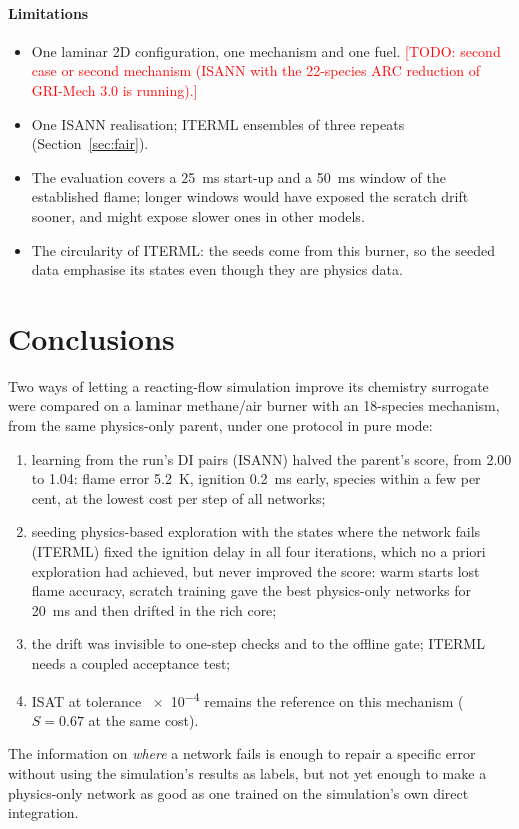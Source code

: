 \documentclass[preprint,review,12pt]{elsarticle}
\newcommand{\todo}[1]{\textcolor{red}{[TODO: #1]}}
\begin{document}
\paragraph{Limitations}
\begin{itemize}
\item One laminar 2D configuration, one mechanism and one fuel. \todo{second case or second mechanism
  (ISANN with the 22-species ARC reduction of GRI-Mech 3.0 is running).}
\item One ISANN realisation; ITERML ensembles of three repeats (Section~\ref{sec:fair}).
\item The evaluation covers a 25~ms start-up and a 50~ms window of the established flame; longer windows would
  have exposed the scratch drift sooner, and might expose slower ones in other models.
\item The circularity of ITERML: the seeds come from this burner, so the seeded data emphasise its states even
  though they are physics data.
\end{itemize}

\section{Conclusions}
\label{sec:conclusions}
Two ways of letting a reacting-flow simulation improve its chemistry surrogate were compared on a laminar
methane/air burner with an 18-species mechanism, from the same physics-only parent, under one protocol in pure
mode:
\begin{enumerate}
\item learning from the run's DI pairs (ISANN) halved the parent's score, from 2.00 to 1.04: flame error 5.2~K,
  ignition 0.2~ms early, species within a few per cent, at the lowest cost per step of all networks;
\item seeding physics-based exploration with the states where the network fails (ITERML) fixed the ignition
  delay in all four iterations, which no a priori exploration had achieved, but never improved the score: warm
  starts lost flame accuracy, scratch training gave the best physics-only networks for 20~ms and then drifted in
  the rich core;
\item the drift was invisible to one-step checks and to the offline gate; ITERML needs a coupled acceptance test;
\item ISAT at tolerance \num{e-4} remains the reference on this mechanism ($S=0.67$ at the same cost).
\end{enumerate}
The information on \emph{where} a network fails is enough to repair a specific error without using the
simulation's results as labels, but not yet enough to make a physics-only network as good as one trained on the
simulation's own direct integration.
\end{document}
